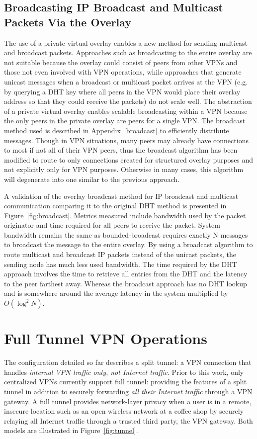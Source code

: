 \subsection{Broadcasting IP Broadcast and Multicast Packets Via the Overlay}
The use of a private virtual overlay enables a new method for sending multicast
and broadcast packets. Approaches such as broadcasting to the entire overlay
are not suitable because the overlay could consist of peers from other VPNs and
those not even involved with VPN operations, while approaches that generate
unicast messages when a broadcast or multicast packet arrives at the VPN (e.g.
by querying a DHT key where all peers in the VPN would place their overlay
address so that they could receive the packets) do not scale well. The
abstraction of a private virtual overlay enables scalable broadcasting within a
VPN because the only peers in the private overlay are peers for a single VPN.
The broadcast method used is described in Appendix~\ref{broadcast} to
efficiently distribute messages.  Though in VPN situations, many peers may
already have connections to most if not all of their VPN peers, thus the
broadcast algorithm has been modified to route to only connections created for
structured overlay purposes and not explicitly only for VPN purposes.
Otherwise in many cases, this algorithm will degenerate into one similar to
the previous approach.  

A validation of the overlay broadcast method for IP broadcast and multicast
communication comparing it to the original DHT method is presented in
Figure~\ref{fig:broadcast}.  Metrics measured include bandwidth used by
the packet originator and time required for all peers to receive the packet.
System bandwidth remains the same as bounded-broadcast requires exactly N
messages to broadcast the message to the entire overlay.  By using a broadcast
algorithm to route multicast and broadcast IP packets instead of the unicast
packets, the sending node has much less used bandwidth.  The time required by
the DHT approach involves the time to retrieve all entries from the DHT and the
latency to the peer farthest away.  Whereas the broadcast approach has no DHT
lookup and is somewhere around the average latency in the system multiplied by
$O(\log^2 N)$.

\section{Full Tunnel VPN Operations}
\label{full_tunnel}
The configuration detailed so far describes a split tunnel: a VPN connection
that handles \emph{internal VPN traffic only, not Internet traffic}.  Prior
to this work, only centralized VPNs currently support full tunnel: providing
the features of a split tunnel in addition to securely forwarding
\emph{all their Internet traffic} through a VPN gateway.  A full tunnel provides
network-layer privacy when a user is in a remote, insecure location such as an
open wireless network at a coffee shop by securely relaying all Internet traffic
through a trusted third party, the VPN gateway.  Both models are illustrated
in Figure~\ref{fig:tunnel}.

